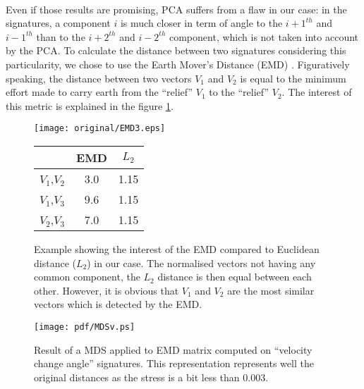 \documentclass[a4paper,twocolumn]{article}
\begin{document}
\paragraph{}%
Even if those results are promising, PCA suffers from a flaw in our case: in the signatures, a component $i$ is much closer in term of angle to the $i+1^{th}$ and $i-1^{th}$ than to the $i+2^{th}$ and $i-2^{th}$ component, which is not taken into account by the PCA. To calculate the distance between two signatures considering this particularity, we chose to use the Earth Mover's Distance (EMD) \cite{Rubner2000}. Figuratively speaking, the distance between two vectors $V_1$ and $V_2$ is equal to the minimum effort made to carry earth from the ``relief'' $V_1$ to the ``relief'' $V_2$. The interest of this metric is explained in the figure \ref{EMD}.
\begin{figure}[ht]
\begin{minipage}[c]{0.57\linewidth}
\centering
\texttt{[image: original/EMD3.eps]}
\end{minipage}
\hspace{0.5cm}
\begin{minipage}[c]{0.35\linewidth}
\centering
	\hspace{-0.8cm}
	\begin{tabular}{|l|c|c|}
		\hline
		&EMD&$L_2$\\
		\hline
		$V_1$,$V_2$&3.0&1.15\\
		$V_1$,$V_3$&9.6&1.15\\
		$V_2$,$V_3$&7.0&1.15\\
		\hline
	\end{tabular}
\end{minipage}
\caption{Example showing the interest of the EMD compared to Euclidean distance ($L_2$) in our case. The normalised vectors not having any common component, the $L_2$ distance is then equal between each other. However, it is obvious that $V_1$ and $V_2$ are the most similar vectors which is detected by the EMD.}
\label{EMD}
\end{figure}
\begin{figure}[!ht]
	\texttt{[image: pdf/MDSv.ps]}
	\caption{Result of a MDS applied to EMD matrix computed on ``velocity change angle'' signatures. This representation represents well the original distances as the stress is a bit less than 0.003.}
	\label{MDSv}
\end{figure}
\end{document}

